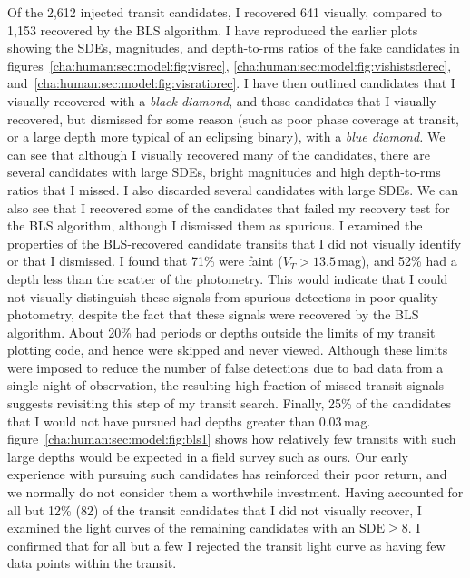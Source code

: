 Of the 2,612 injected transit candidates, I recovered 641 visually, compared to 1,153 recovered by the BLS algorithm.
I have reproduced the earlier plots showing the SDEs, magnitudes, and depth-to-rms ratios of the fake candidates in figures~\ref{cha:human:sec:model:fig:visrec}, \ref{cha:human:sec:model:fig:vishistsderec}, and~\ref{cha:human:sec:model:fig:visratiorec}. I have then outlined candidates that I visually recovered with a {\it black diamond}, and those candidates that I visually recovered, but dismissed for some reason (such as poor phase coverage at transit, or a large depth more typical of an eclipsing binary), with a {\it blue diamond.}
We can see that although I visually recovered many of the candidates, there are several candidates with large SDEs, bright magnitudes and high depth-to-rms ratios that I missed. 
I also discarded several candidates with large SDEs.
We can also see that I recovered some of the candidates that failed my recovery test for the BLS algorithm, although I dismissed them as spurious. 
I examined the properties of the BLS-recovered candidate transits that I did not visually identify or that I dismissed. 
I found that 71\% were faint ($V_{T}>13.5$\,mag), and 52\% had a depth less than the scatter of the photometry. 
This would indicate that I could not visually distinguish these signals from spurious detections in poor-quality photometry, despite the fact that these signals were recovered by the BLS algorithm.
About 20\% had periods or depths outside the limits of my transit plotting code, and hence were skipped and never viewed.
Although these limits were imposed to reduce the number of false detections due to bad data from a single night of observation, the resulting high fraction of missed transit signals suggests revisiting this step of my transit search.
Finally, 25\% of the candidates that I would not have pursued had depths greater than 0.03\,mag. 
figure~\ref{cha:human:sec:model:fig:bls1} %
shows how relatively few transits with such large depths would be expected in a field survey such as ours.
Our early experience with pursuing such candidates has reinforced their poor return, and we normally do not consider them a worthwhile investment. 
Having accounted for all but 12\% (82) of the transit candidates that I did not visually recover, I examined the light curves of the remaining candidates with an $\mathrm{SDE}\geq8$. 
I confirmed that for all but a few I rejected the transit light curve as having few data points within the transit.


